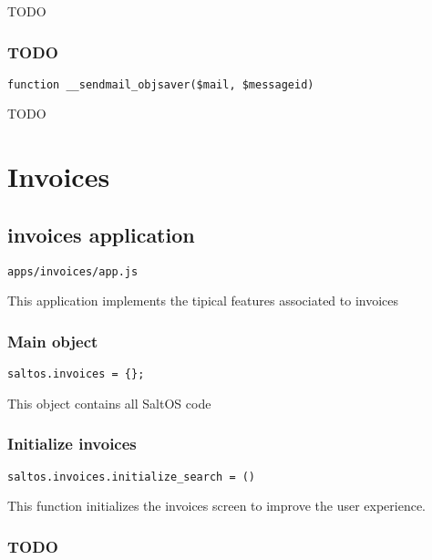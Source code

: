 \documentclass[a4paper]{book}
\begin{document}
TODO

\hypertarget{toc566}{}
\subsection{TODO}

\begin{lstlisting}
function __sendmail_objsaver($mail, $messageid)
\end{lstlisting}

TODO


\hypertarget{toc567}{}
\chapter{Invoices}

\hypertarget{toc568}{}
\section{invoices application}

\begin{lstlisting}
apps/invoices/app.js
\end{lstlisting}

This application implements the tipical features associated to invoices

\hypertarget{toc569}{}
\subsection{Main object}

\begin{lstlisting}
saltos.invoices = {};
\end{lstlisting}

This object contains all SaltOS code

\hypertarget{toc570}{}
\subsection{Initialize invoices}

\begin{lstlisting}
saltos.invoices.initialize_search = ()
\end{lstlisting}

This function initializes the invoices screen to improve the user experience.

\hypertarget{toc571}{}
\subsection{TODO}
\end{document}
